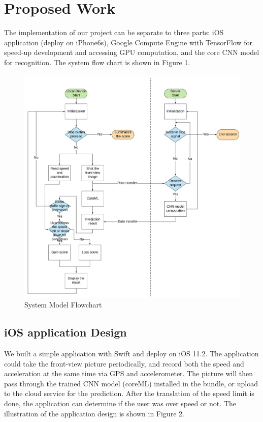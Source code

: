 \documentclass[conference]{IEEEtran}
\begin{document}
\section{Proposed Work}
The implementation of our project can be separate to three parts: iOS application (deploy on iPhone6s), Google Compute Engine with TensorFlow for speed-up development and accessing GPU computation, and the core CNN model for recognition. The system flow chart is shown in Figure 1.
\begin{figure}[t]
\centering
  \begin{minipage}{.4\textwidth}
    \centering
    \includegraphics[width=1.2\linewidth]{system_flowchart.png}
    \caption{System Model Flowchart}
    \label{fig:fig_1}
  \end{minipage}
\end{figure}
\subsection{iOS application Design}
We built a simple application with Swift and deploy on iOS 11.2. The application could take the front-view picture periodically, and record both the speed and acceleration at the same time via GPS and accelerometer. The picture will then pass through the trained CNN model (coreML) installed in the bundle, or upload to the cloud service for the prediction. After the translation of the speed limit is done, the application can determine if the user was over speed or not. The illustration of the application design is shown in Figure 2.
\end{document}
